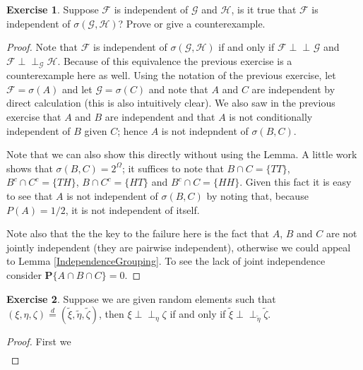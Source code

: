 \documentclass{amsbook}
\theoremstyle{definition}
\newtheorem{xca}{Exercise}
\theoremstyle{remark}
\newcommand{\Independent}{\perp \! \! \! \perp}
\newcommand{\cindependent}[3]{#1 \Independent_{#3} #2}
\newcommand{\probability}[1]{\textbf{P}\{#1\}}
\newcommand{\eqdist}{\overset{d}=}
\begin{document}
\begin{xca}Suppose $\mathcal{F}$ is independent of $\mathcal{G}$ and
  $\mathcal{H}$, is it true that $\mathcal{F}$ is independent of
  $\sigma(\mathcal{G}, \mathcal{H})$?  Prove or give a counterexample.
\end{xca}
\begin{proof}
Note that $\mathcal{F}$ is independent of
  $\sigma(\mathcal{G}, \mathcal{H})$ if and only if
  $\cindependent{\mathcal{F}}{\mathcal{G}}{}$
and $\cindependent{\mathcal{F}}{\mathcal{H}}{\mathcal{G}}$.  Because
of this equivalence the previous exercise is a counterexample here as
well.  Using the
notation of the previous exercise, let $\mathcal{F} = \sigma(A)$ and
let $\mathcal{G} = \sigma(C)$ and note that $A$ and $C$ are
independent
by direct calculation (this is also intuitively clear).  We also saw
in the previous exercise that $A$ and $B$ are independent and that $A$
is not conditionally independent of $B$ given $C$; hence $A$ is not
indepndent of $\sigma(B,C)$.

Note that we can also show this directly without using the Lemma. A
little work shows that $\sigma(B,C) = 2^\Omega$; it suffices to
note that $B \cap C = \lbrace TT \rbrace$,  $B^c \cap C^c = \lbrace TH
\rbrace$, $B \cap C^c = \lbrace HT \rbrace$ and $B^c \cap C = \lbrace HH
\rbrace$.  Given this fact
it is easy to see that $A$ is not independent of $\sigma(B,C)$ by noting that, because
$P(A) = 1/2$, it is not independent of itself.

Note also that the the key to the failure here is the fact that $A$, $B$
and $C$ are not jointly independent (they are pairwise independent),
otherwise we could appeal to Lemma \ref{IndependenceGrouping}.
To see the lack of joint independence consider $\probability {A \cap B
\cap C} = 0$.
\end{proof}

\begin{xca}Suppose we are given random elements such that $(\xi, \eta,
  \zeta) \eqdist (\tilde{\xi}, \tilde{\eta}, \tilde{\zeta})$, then
  $\cindependent{\xi}{\zeta}{\eta}$ if and only if $\cindependent{\tilde{\xi}}{\tilde{\zeta}}{\tilde{\eta}}$.
\end{xca}
\begin{proof}
First we 
\begin{align*}
\
\end{align*}
\end{proof}
\end{document}
